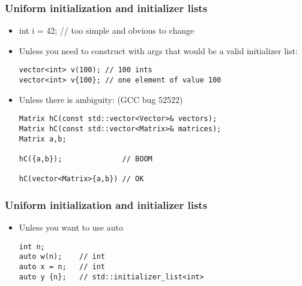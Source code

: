 \begin{frame}[fragile,t]
\frametitle{Uniform initialization and initializer lists}
\begin{itemize}
\item int i = 42; // too simple and obvious to change
\vskip 6pt
\item Unless you need to construct with args that would be a valid initializer list: 
\begin{verbatim}
vector<int> v(100); // 100 ints
vector<int> v{100}; // one element of value 100
\end{verbatim}
\vskip 6pt
\item Unless there is ambiguity: (GCC bug 52522)
\begin{verbatim}
Matrix hC(const std::vector<Vector>& vectors);
Matrix hC(const std::vector<Matrix>& matrices);
Matrix a,b;

hC({a,b});              // BOOM

hC(vector<Matrix>{a,b}) // OK

\end{verbatim}
\end{itemize}
\end{frame}


\begin{frame}[fragile,t]
\frametitle{Uniform initialization and initializer lists}

\vskip 12pt
\begin{itemize}
\item Unless you want to use auto
\begin{verbatim}
int n;
auto w(n);    // int
auto x = n;   // int
auto y {n};   // std::initializer_list<int>
\end{verbatim}
\end{itemize}
\end{frame}
